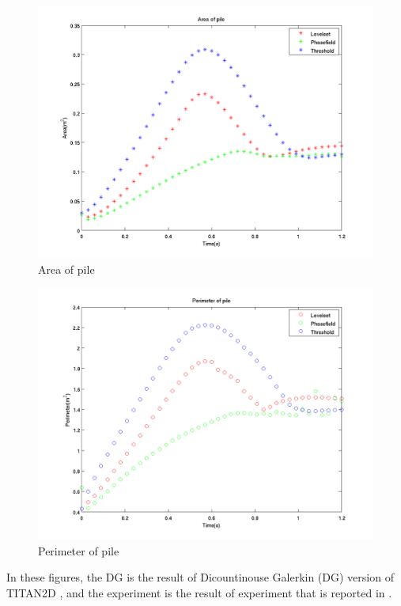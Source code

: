 \documentclass[letterpaper,10pt]{article}
\begin{document}
\begin{figure}[H]
\centerline{\includegraphics[scale=0.5]{IMAGES/area.png}}
\caption{Area of pile}
\label{wet_area}
\end{figure}

\begin{figure}[H]
\centerline{\includegraphics[scale=0.5]{IMAGES/perimeter.png}}
\caption{Perimeter of pile}
\label{wet_area}
\end{figure}

In these figures, the DG is the result of Dicountinouse Galerkin (DG) version of TITAN2D \cite{}, and the experiment is the result of experiment 
that is reported in \cite{}.


\end{document}
